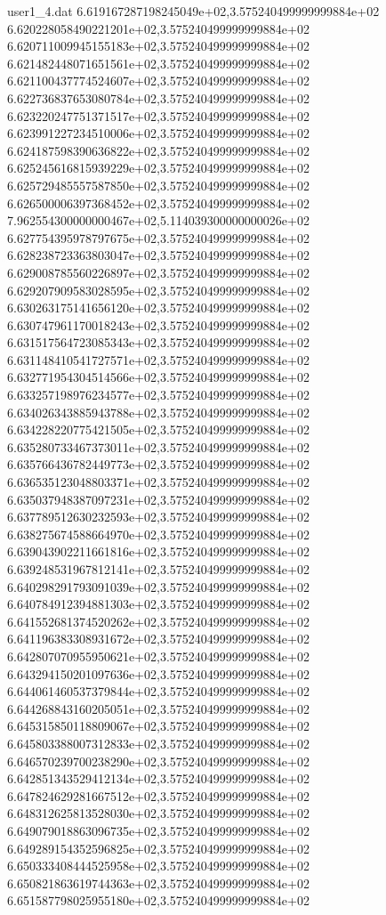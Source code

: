 \begin{filecontents}{user1_4.dat}
6.619167287198245049e+02,3.575240499999999884e+02
6.620228058490221201e+02,3.575240499999999884e+02
6.620711009945155183e+02,3.575240499999999884e+02
6.621482448071651561e+02,3.575240499999999884e+02
6.621100437774524607e+02,3.575240499999999884e+02
6.622736837653080784e+02,3.575240499999999884e+02
6.623220247751371517e+02,3.575240499999999884e+02
6.623991227234510006e+02,3.575240499999999884e+02
6.624187598390636822e+02,3.575240499999999884e+02
6.625245616815939229e+02,3.575240499999999884e+02
6.625729485557587850e+02,3.575240499999999884e+02
6.626500006397368452e+02,3.575240499999999884e+02
7.962554300000000467e+02,5.114039300000000026e+02
6.627754395978797675e+02,3.575240499999999884e+02
6.628238723363803047e+02,3.575240499999999884e+02
6.629008785560226897e+02,3.575240499999999884e+02
6.629207909583028595e+02,3.575240499999999884e+02
6.630263175141656120e+02,3.575240499999999884e+02
6.630747961170018243e+02,3.575240499999999884e+02
6.631517564723085343e+02,3.575240499999999884e+02
6.631148410541727571e+02,3.575240499999999884e+02
6.632771954304514566e+02,3.575240499999999884e+02
6.633257198976234577e+02,3.575240499999999884e+02
6.634026343885943788e+02,3.575240499999999884e+02
6.634228220775421505e+02,3.575240499999999884e+02
6.635280733467373011e+02,3.575240499999999884e+02
6.635766436782449773e+02,3.575240499999999884e+02
6.636535123048803371e+02,3.575240499999999884e+02
6.635037948387097231e+02,3.575240499999999884e+02
6.637789512630232593e+02,3.575240499999999884e+02
6.638275674588664970e+02,3.575240499999999884e+02
6.639043902211661816e+02,3.575240499999999884e+02
6.639248531967812141e+02,3.575240499999999884e+02
6.640298291793091039e+02,3.575240499999999884e+02
6.640784912394881303e+02,3.575240499999999884e+02
6.641552681374520262e+02,3.575240499999999884e+02
6.641196383308931672e+02,3.575240499999999884e+02
6.642807070955950621e+02,3.575240499999999884e+02
6.643294150201097636e+02,3.575240499999999884e+02
6.644061460537379844e+02,3.575240499999999884e+02
6.644268843160205051e+02,3.575240499999999884e+02
6.645315850118809067e+02,3.575240499999999884e+02
6.645803388007312833e+02,3.575240499999999884e+02
6.646570239700238290e+02,3.575240499999999884e+02
6.642851343529412134e+02,3.575240499999999884e+02
6.647824629281667512e+02,3.575240499999999884e+02
6.648312625813528030e+02,3.575240499999999884e+02
6.649079018863096735e+02,3.575240499999999884e+02
6.649289154352596825e+02,3.575240499999999884e+02
6.650333408444525958e+02,3.575240499999999884e+02
6.650821863619744363e+02,3.575240499999999884e+02
6.651587798025955180e+02,3.575240499999999884e+02

\end{filecontents}
